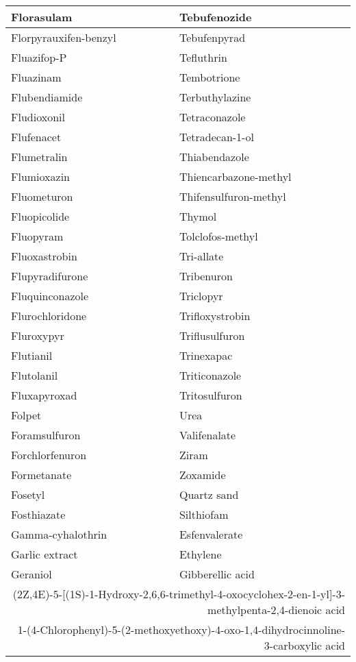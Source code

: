 \begin{small}
\begin{longtable}{|l|l|}
        Florasulam & Tebufenozide \\ \hline
        Florpyrauxifen-benzyl & Tebufenpyrad \\ \hline
        Fluazifop-P & Tefluthrin \\ \hline
        Fluazinam & Tembotrione \\ \hline
        Flubendiamide & Terbuthylazine \\ \hline
        Fludioxonil & Tetraconazole \\ \hline
        Flufenacet & Tetradecan-1-ol \\ \hline
        Flumetralin & Thiabendazole \\ \hline
        Flumioxazin & Thiencarbazone-methyl \\ \hline
        Fluometuron & Thifensulfuron-methyl \\ \hline
        Fluopicolide & Thymol \\ \hline
        Fluopyram & Tolclofos-methyl \\ \hline
        Fluoxastrobin & Tri-allate \\ \hline
        Flupyradifurone & Tribenuron \\ \hline
        Fluquinconazole & Triclopyr \\ \hline
        Flurochloridone & Trifloxystrobin \\ \hline
        Fluroxypyr & Triflusulfuron \\ \hline
        Flutianil & Trinexapac \\ \hline
        Flutolanil & Triticonazole \\ \hline
        Fluxapyroxad & Tritosulfuron \\ \hline
        Folpet & Urea \\ \hline
        Foramsulfuron & Valifenalate \\ \hline
        Forchlorfenuron & Ziram \\ \hline
        Formetanate & Zoxamide \\ \hline
        Fosetyl & Quartz sand \\ \hline
        Fosthiazate & Silthiofam \\ \hline
        Gamma-cyhalothrin & Esfenvalerate \\ \hline
        Garlic extract & Ethylene \\ \hline
        Geraniol & Gibberellic acid \\ \hline
\multicolumn{2}{|r|}{{(2Z,4E)-5-[(1S)-1-Hydroxy-2,6,6-trimethyl-4-oxocyclohex-2-en-1-yl]-3-methylpenta-2,4-dienoic acid}}\\ \hline
\multicolumn{2}{|r|}{{1-(4-Chlorophenyl)-5-(2-methoxyethoxy)-4-oxo-1,4-dihydrocinnoline-3-carboxylic acid}}
\end{longtable}
\end{small}

